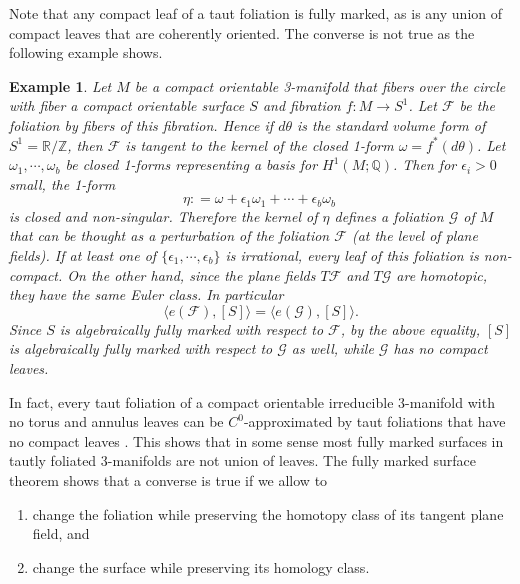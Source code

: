 \documentclass[11pt]{amsart}
\newtheorem{example}[thm]{Example}
\theoremstyle{remark}
\theoremstyle{definition}
\begin{document}
	Note that any compact leaf of a taut foliation is fully marked, as is any union of compact leaves that are coherently oriented. The converse is not true as the following example shows. 
	
	\begin{example}
		Let $M$ be a compact orientable 3-manifold that fibers over the circle with fiber a compact orientable surface $S$ and fibration $f \colon M \rightarrow S^1$. Let $\mathcal{F}$ be the foliation by fibers of this fibration. Hence if $d\theta $ is the standard volume form of $S^1 = \mathbb{R}/\mathbb{Z}$, then $\mathcal{F}$ is tangent to the kernel of the closed 1-form $\omega = f^*(d \theta)$. Let  $\omega_1, \cdots, \omega_b$ be closed 1-forms representing a basis  for $H^1(M ; \mathbb{Q})$. Then for $\epsilon_i >0$ small, the 1-form 
		\[ \eta: = \omega + \epsilon_1 \omega_1 + \cdots + \epsilon_b \omega_b\ \]
		is closed and non-singular. Therefore the kernel of $\eta$ defines a foliation $\mathcal{G}$ of $M$ that can be thought as a perturbation of the foliation $\mathcal{F}$ (at the level of plane fields). If at least one of $\{ \epsilon_1, \cdots, \epsilon_b \}$ is irrational, every leaf of this foliation is non-compact. On the other hand, since the plane fields $T \mathcal{F}$ and $T \mathcal{G}$ are homotopic, they have the same Euler class. In particular 
		\[ \langle e(\mathcal{F}) , [S] \rangle  = \langle e(\mathcal{G}) , [S] \rangle. \]
		Since $S$ is algebraically fully marked with respect to $\mathcal{F}$, by the above equality, $[S]$ is algebraically fully marked with respect to $\mathcal{G}$ as well, while $\mathcal{G}$ has no compact leaves. 
	\end{example}

	In fact, every taut foliation of a compact orientable irreducible 3-manifold with no torus and annulus leaves can be $C^0$-approximated by taut foliations that have no compact leaves \cite{bonatti1994feuilles, tsuboi1994hyperbolic}. This shows that in some sense most fully marked surfaces in tautly foliated 3-manifolds are not union of leaves. The fully marked surface theorem shows that a converse is true if we allow to 
	
	\begin{enumerate}
		\item change the foliation while preserving the homotopy class of its tangent plane field, and
		\item change the surface while preserving its homology class. 
	\end{enumerate}
\end{document}
